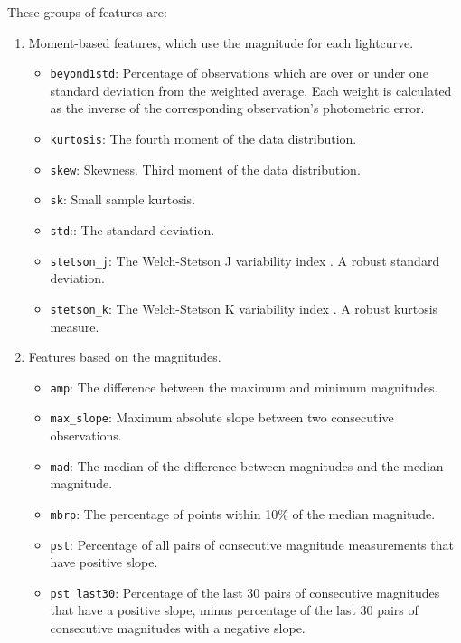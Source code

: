 \documentclass[a4paper,fleqn,usenatbib]{mnras}
\begin{document}
These groups of features are:

\begin{enumerate}
    
\item Moment-based features, which use the magnitude for each lightcurve.
  \begin{itemize}
  \item \texttt{beyond1std}: 
    Percentage of observations which are over or under one standard
    deviation from the weighted average. Each weight is calculated as
    the inverse of the corresponding observation's photometric error. 
  \item \texttt{kurtosis}: 
    The fourth moment of the data distribution. 
  \item \texttt{skew}: 
    Skewness. Third moment of the data distribution.
  \item \texttt{sk}:
    Small sample kurtosis.
  \item \texttt{std}::
    The standard deviation.
  \item \texttt{stetson\_j}:
    The Welch-Stetson J variability index
    \citep{1996PASP..108..851S}. A robust standard deviation. 
  \item \texttt{stetson\_k}:  The Welch-Stetson K variability index
    \citep{1996PASP..108..851S}. A robust kurtosis measure. 
  \end{itemize}
  
\item Features based on the magnitudes.
    \begin{itemize}
    \item \texttt{amp}: 
      The difference between the maximum and minimum magnitudes.
    \item \texttt{max\_slope}: 
      Maximum absolute slope between two consecutive observations.
    \item \texttt{mad}: 
      The median of the difference between magnitudes and the median
      magnitude. 
    \item \texttt{mbrp}: 
      The percentage of points within 10\% of the median magnitude.
    \item \texttt{pst}: 
      Percentage of all pairs of consecutive magnitude measurements that have positive slope.
    \item \texttt{pst\_last30}: 
      Percentage of the last 30 pairs of consecutive magnitudes that
      have a positive slope, minus percentage of the last 30 pairs of
      consecutive magnitudes with a negative slope. 
    \end{itemize} 



\end{enumerate}
\end{document}
